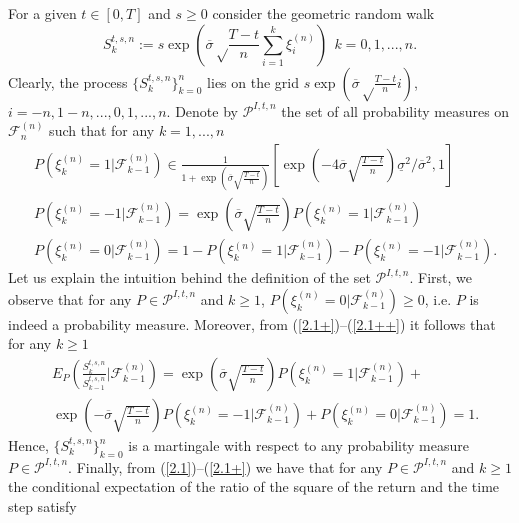 \documentclass{amsart}
\numberwithin{equation}{section}
\begin{document}
For a given
$t\in [0,T]$ and $s\geq 0$
consider the geometric random walk
\[S^{t,s,n}_k:=s\exp\left(\overline{\sigma}\sqrt\frac{T-t}{n}\sum_{i=1}^k \xi^{(n)}_i\right) \ \ k=0,1,...,n.\]
Clearly, the process $\{S^{t,s,n}_k\}_{k=0}^n$ lies on the grid
$s\exp\left(\overline{\sigma}\sqrt\frac{T-t}{n} i\right)$, $i=-n,1-n,...,0,1,...,n$.
Denote by $\mathcal{P}^{I,t,n}$ the set of all probability measures on $\mathcal{F}^{(n)}_n$
such that for any $k=1,...,n$
\begin{eqnarray}\label{2.1}
&P(\xi^{(n)}_k=1|\mathcal F^{(n)}_{k-1})\in \frac{1}{1+\exp(\overline{\sigma}\sqrt{\frac{T-t}{n}})}\left[\exp\left(-4\overline{\sigma}\sqrt{\frac{T-t}{n}}\right)\underline{\sigma}^2/\overline{\sigma}^2,1\right]\\
&P(\xi^{(n)}_k=-1|\mathcal F^{(n)}_{k-1})=\exp(\overline{\sigma}\sqrt{\frac{T-t}{n}})P(\xi^{(n)}_k=1|\mathcal F^{(n)}_{k-1})\label{2.1+}\\
&P(\xi^{(n)}_k=0|\mathcal F^{(n)}_{k-1})=1- P(\xi^{(n)}_k=1|\mathcal F^{(n)}_{k-1})-P(\xi^{(n)}_k=-1|\mathcal F^{(n)}_{k-1}).\label{2.1++}
\end{eqnarray}
Let us explain the intuition behind the definition of the set $\mathcal{P}^{I,t,n}$.
First, we observe that for any $P\in \mathcal{P}^{I,t,n}$
and $k\geq 1$,
$P(\xi^{(n)}_k=0|\mathcal F^{(n)}_{k-1})\geq 0$, i.e. $P$ is indeed a probability measure.
Moreover, from
(\ref{2.1+})--(\ref{2.1++}) it follows that
for any $k\geq 1$
\begin{eqnarray*}
&E_P\left(\frac{S^{t,s,n}_{k}}{S^{t,s,n}_{k-1}}\big|\mathcal F^{(n)}_{k-1}\right)=
\exp\left(\overline{\sigma}\sqrt{\frac{T-t}{n}}\right)P(\xi^{(n)}_k=1|\mathcal F^{(n)}_{k-1})+\\
&\exp\left(-\overline{\sigma}\sqrt{\frac{T-t}{n}}\right)P(\xi^{(n)}_k=-1|\mathcal F^{(n)}_{k-1})+P(\xi^{(n)}_k=0|\mathcal F^{(n)}_{k-1})=1.
\end{eqnarray*}
Hence,
$\{S^{t,s,n}_k\}_{k=0}^n$ is a martingale
with respect to any probability measure $P\in\mathcal {P}^{I,t,n}$. Finally, from (\ref{2.1})--(\ref{2.1+}) we have that
for any $P\in\mathcal {P}^{I,t,n}$ and $k\geq 1$ the conditional expectation of the ratio of the square of the return and the time step satisfy
\end{document}
